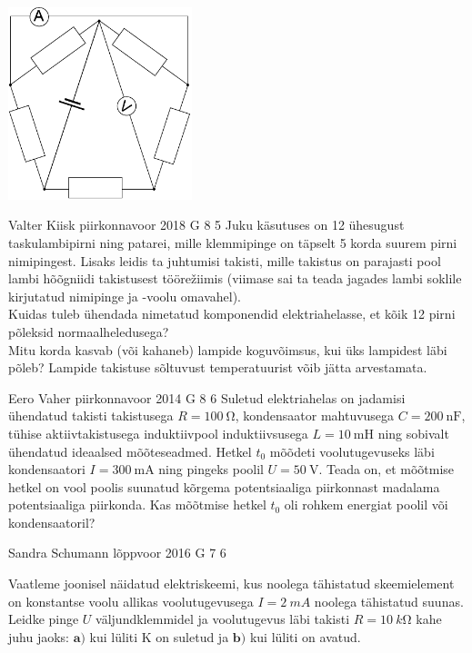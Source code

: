 \documentclass[11pt, twoside]{article}
\begin{document}
{{\begin{center}
	\includegraphics[width=0.4\textwidth]{2017-v3g-06-viisnurk}
\end{center}
\fi
}

{Valter Kiisk} %
{piirkonnavoor} %
{2018} %
{G 8} %
{5} %
{
\ifStatement
Juku käsutuses on 12 ühesugust taskulambipirni ning patarei, mille klemmipinge on täpselt 5 korda suurem pirni nimipingest. Lisaks leidis ta juhtumisi takisti, mille takistus on parajasti pool lambi hõõgniidi takistusest töörežiimis (viimase sai ta teada jagades lambi soklile kirjutatud nimipinge ja -voolu omavahel).\\
\osa Kuidas tuleb ühendada nimetatud komponendid elektriahelasse, et kõik 12 pirni põleksid normaalheledusega?\\
\osa Mitu korda kasvab (või kahaneb) lampide koguvõimsus, kui üks lampidest läbi põleb? Lampide takistuse sõltuvust temperatuurist võib jätta arvestamata.
\fi
}

{Eero Vaher} %
{piirkonnavoor} %
{2014} %
{G 8} %
{6} %
{
\ifStatement
Suletud elektriahelas on jadamisi ühendatud takisti takistusega $R=\SI{100}{\ohm}$, kondensaator mahtuvusega $C=\SI{200}{\nano\farad}$, tühise aktiivtakistusega induktiivpool induktiivsusega $L=\SI{10}{\milli\henry}$ ning sobivalt ühendatud ideaalsed mõõteseadmed. Hetkel $t_0$ mõõdeti voolutugevuseks läbi kondensaatori $I=\SI{300}{\milli\ampere}$ ning pingeks poolil $U=\SI{50}{\volt}$. Teada on, et mõõtmise hetkel on vool poolis suunatud kõrgema potentsiaaliga piirkonnast madalama potentsiaaliga piirkonda. Kas mõõtmise hetkel $t_0$ oli rohkem energiat poolil või kondensaatoril? 
\fi
}

{Sandra Schumann} %
{lõppvoor} %
{2016} %
{G 7} %
{6} %
{
\ifStatement
Vaatleme joonisel näidatud elektriskeemi, kus noolega tähistatud skeemielement on konstantse voolu allikas voolutugevusega $I=\SI{2}{mA}$ noolega tähistatud suunas. Leidke pinge $U$ väljundklemmidel ja voolutugevus läbi takisti $R=\SI{10}{k\ohm}$ kahe juhu jaoks: $\textbf{a)}$ kui lüliti K on suletud ja $\textbf{b)}$ kui lüliti on avatud.

}}
\end{document}
